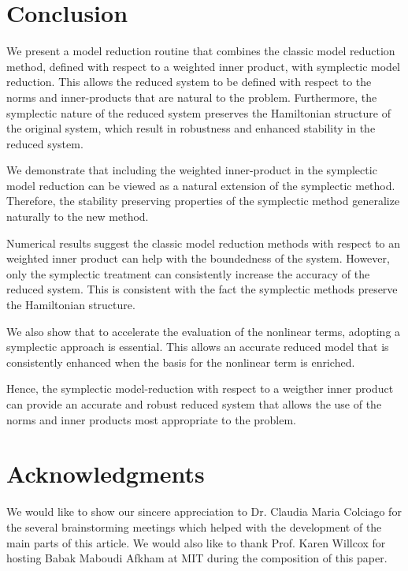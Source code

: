 \section{Conclusion} \label{sec:conc}
We present a model reduction routine that combines the classic model reduction method, defined with respect to a weighted inner product, with symplectic model reduction. This allows the reduced system to be defined with respect to the norms and inner-products that are natural to the problem. Furthermore, the symplectic nature of the reduced system preserves the Hamiltonian structure of the original system, which result in robustness and enhanced stability in the reduced system.

We demonstrate that including the weighted inner-product in the symplectic model reduction can be viewed as a natural extension of the symplectic method. Therefore, the stability preserving properties of the symplectic method generalize naturally to the new method.

Numerical results suggest the classic model reduction methods with respect to an weighted inner product can help with the boundedness of the system. However, only the symplectic treatment can consistently increase the accuracy of the reduced system. This is consistent with the fact the symplectic methods preserve the Hamiltonian structure.

We also show that to accelerate the evaluation of the nonlinear terms, adopting a symplectic approach is essential. This allows an accurate reduced model that is consistently enhanced when the basis for the nonlinear term is enriched.

Hence, the symplectic model-reduction with respect to a weigther inner product can provide an accurate and robust reduced system that allows the use of the norms and inner products most appropriate to the problem.

\section*{Acknowledgments} We would like to show our sincere appreciation to Dr. Claudia Maria Colciago for the several brainstorming meetings which helped with the development of the main parts of this article. We would also like to thank Prof. Karen Willcox for hosting Babak Maboudi Afkham at MIT during the composition of this paper. 
